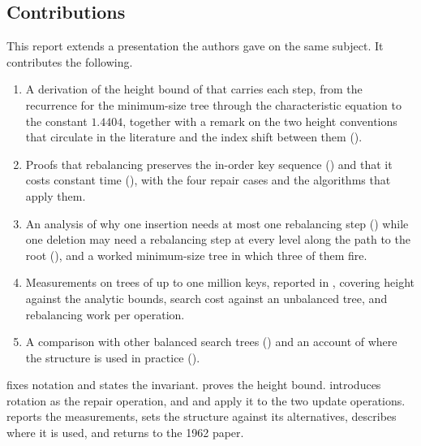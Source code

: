 \subsection*{Contributions}

This report extends a presentation the authors gave on the same subject. It
contributes the following.

\begin{enumerate}
  \item A derivation of the height bound of  that carries
    each step, from the recurrence for the minimum-size tree through the
    characteristic equation to the constant $1.4404$, together with a remark on
    the two height conventions that circulate in the literature and the index
    shift between them ().
  \item Proofs that rebalancing preserves the in-order key sequence
    () and that it costs constant time
    (), with the four repair cases and the algorithms that
    apply them.
  \item An analysis of why one insertion needs at most one rebalancing step
    () while one deletion may need a rebalancing step at
    every level along the path to the root (), and a
    worked minimum-size tree in which three of them fire.
  \item Measurements on trees of up to one million keys, reported in
    , covering height against the analytic bounds, search cost
    against an unbalanced tree, and rebalancing work per operation.
  \item A comparison with other balanced search trees
    () and an account of where the structure is used in
    practice ().
\end{enumerate}

 fixes notation and states the invariant.
 proves the height bound.  introduces
rotation as the repair operation, and  and
 apply it to the two update operations.
 reports the measurements,  sets the
structure against its alternatives,  describes where it
is used, and  returns to the 1962 paper.
